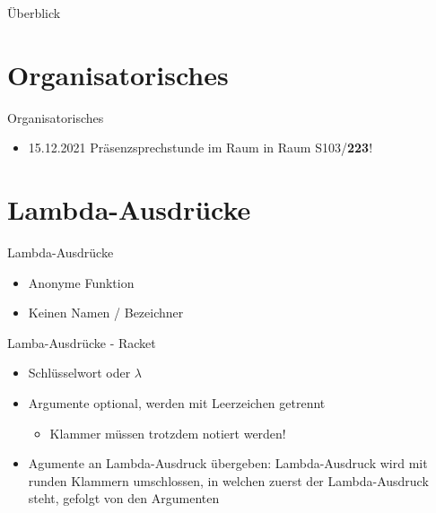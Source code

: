 \documentclass{../tuda-beamer}
\date{08. Dezember 2021}
\begin{document}
  \maketitle

  \begin{frame}{Überblick}
    \tableofcontents
  \end{frame}


  \section{Organisatorisches}
  \begin{frame}{Organisatorisches}
    \begin{itemize}
      \item 15.12.2021 Präsenzsprechstunde im Raum in Raum S103/\textbf{223}!
    \end{itemize}
  \end{frame}


  \section{Lambda-Ausdrücke}
  \begin{frame}{Lambda-Ausdrücke}
    \begin{itemize}
      \item Anonyme Funktion
      \item Keinen Namen / Bezeichner
    \end{itemize}
  \end{frame}

  \begin{frame}{Lamba-Ausdrücke - Racket}
    \begin{itemize}
      \item Schlüsselwort  oder \textcolor{keywordcolor}{\(\lambda\)}
      \item Argumente optional, werden mit Leerzeichen getrennt
      \begin{itemize}
        \item Klammer müssen trotzdem notiert werden!
      \end{itemize}
      \item Agumente an Lambda-Ausdruck übergeben: Lambda-Ausdruck wird mit runden Klammern
      umschlossen, in welchen zuerst der Lambda-Ausdruck steht, gefolgt von den Argumenten
    \end{itemize}
    
  \end{frame}
\end{document}
